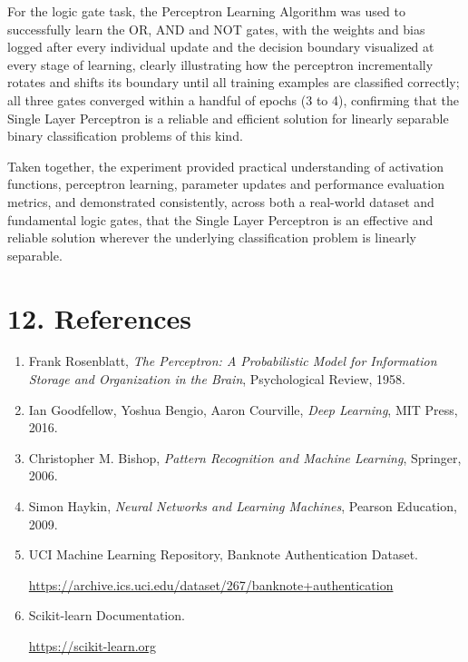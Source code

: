 \documentclass[11pt,a4paper]{article}
\begin{document}
For the logic gate task, the Perceptron Learning Algorithm was used to successfully learn the OR, AND and NOT gates, with the weights and bias logged after every individual update and the decision boundary visualized at every stage of learning, clearly illustrating how the perceptron incrementally rotates and shifts its boundary until all training examples are classified correctly; all three gates converged within a handful of epochs (3 to 4), confirming that the Single Layer Perceptron is a reliable and efficient solution for linearly separable binary classification problems of this kind.

Taken together, the experiment provided practical understanding of activation functions, perceptron learning, parameter updates and performance evaluation metrics, and demonstrated consistently, across both a real-world dataset and fundamental logic gates, that the Single Layer Perceptron is an effective and reliable solution wherever the underlying classification problem is linearly separable.

\section*{12. References}

\begin{enumerate}

\item Frank Rosenblatt,
\textit{The Perceptron: A Probabilistic Model for Information Storage and Organization in the Brain},
Psychological Review,
1958.

\item Ian Goodfellow,
Yoshua Bengio,
Aaron Courville,
\textit{Deep Learning},
MIT Press,
2016.

\item Christopher M. Bishop,
\textit{Pattern Recognition and Machine Learning},
Springer,
2006.

\item Simon Haykin,
\textit{Neural Networks and Learning Machines},
Pearson Education,
2009.

\item UCI Machine Learning Repository,
Banknote Authentication Dataset.

\url{https://archive.ics.uci.edu/dataset/267/banknote+authentication}

\item Scikit-learn Documentation.

\url{https://scikit-learn.org}

\end{enumerate}

\vfill
\end{document}
